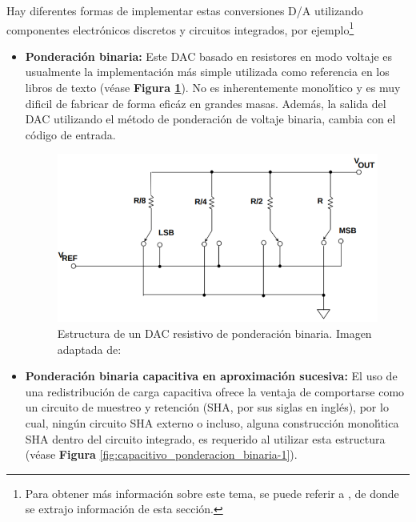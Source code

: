 Hay diferentes formas de implementar estas conversiones D/A utilizando
componentes electr\'{o}nicos discretos y circuitos integrados, por
ejemplo\footnote{Para obtener m\'{a}s informaci\'{o}n sobre este tema, se puede referir
a \cite{binary_dacs_analogdev}, de donde se extrajo informaci\'{o}n
de esta secci\'{o}n.}
\begin{itemize}
\item \textbf{Ponderaci\'{o}n binaria: }Este DAC basado en resistores en
modo voltaje es usualmente la implementaci\'{o}n m\'{a}s simple utilizada
como referencia en los libros de texto (v\'{e}ase \textbf{Figura \ref{fig:Estructura-de-un-1}}).
No es inherentemente monol\'{\i}tico y es muy dificil de fabricar
de forma efic\'{a}z en grandes masas. Adem\'{a}s, la salida del DAC
utilizando el m\'{e}todo de ponderaci\'{o}n de voltaje binaria, cambia
con el c\'{o}digo de entrada. 
\begin{figure}[H]
\begin{centering}
\includegraphics[scale=0.4]{img/binary_res}
\par\end{centering}
\caption{\label{fig:Estructura-de-un-1}Estructura de un DAC resistivo de ponderaci\'{o}n
binaria. Imagen adaptada de: \cite{ad_resistive_one}}
\end{figure}
\item \textbf{Ponderaci\'{o}n binaria capacitiva en aproximaci\'{o}n sucesiva:
}El uso de una redistribuci\'{o}n de carga capacitiva ofrece la ventaja
de comportarse como un circuito de muestreo y retenci\'{o}n (SHA,
por sus siglas en ingl\'{e}s), por lo cual, ning\'{u}n circuito SHA
externo o incluso, alguna construcci\'{o}n monol\'{\i}tica SHA dentro
del circuito integrado, es requerido al utilizar esta estructura (v\'{e}ase
\textbf{Figura} \ref{fig:capacitivo_ponderacion_binaria-1}). 
\begin{figure}[H]

\end{figure}
\end{itemize}
